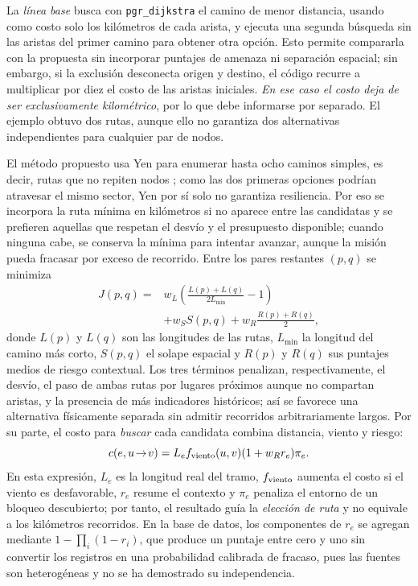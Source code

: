 \documentclass[journal,10pt]{IEEEtran}
\begin{document}
La \emph{línea base} busca con \texttt{pgr\_dijkstra} el camino de menor
distancia, usando como costo solo los kilómetros de cada arista, y ejecuta
una segunda búsqueda sin las aristas del primer camino para obtener otra
opción. Esto permite compararla con la propuesta sin incorporar puntajes
de amenaza ni separación espacial; sin embargo, si la exclusión
desconecta origen y destino, el código recurre a multiplicar por diez el
costo de las aristas iniciales. \emph{En ese caso el costo deja de ser
exclusivamente kilométrico}, por lo que debe informarse por separado.
El ejemplo obtuvo dos rutas, aunque ello no garantiza dos alternativas
independientes para cualquier par de nodos.

El método propuesto usa Yen para enumerar hasta ocho caminos simples, es
decir, rutas que no repiten nodos \cite{yen,pgr}; como las dos primeras
opciones podrían atravesar el mismo sector, Yen por sí solo no garantiza
resiliencia. Por eso se incorpora la ruta mínima en kilómetros si no
aparece entre las candidatas y se prefieren aquellas que respetan el
desvío y el presupuesto disponible; cuando ninguna cabe, se conserva la
mínima para intentar avanzar, aunque la misión pueda fracasar por exceso
de recorrido. Entre los pares restantes $(p,q)$ se minimiza
\begin{equation}
\begin{aligned}
 J(p,q)={}&w_L\!\left(\frac{L(p)+L(q)}{2L_{\min}}-1\right)\\
          &+w_S S(p,q)+w_R\frac{R(p)+R(q)}{2},
\end{aligned}
\end{equation}
donde $L(p)$ y $L(q)$ son las longitudes de las rutas, $L_{\min}$ la longitud
del camino más corto, $S(p,q)$ el solape espacial y $R(p)$ y $R(q)$ sus
puntajes medios de riesgo contextual. Los tres términos penalizan,
respectivamente, el desvío, el paso de ambas rutas por lugares próximos
aunque no compartan aristas, y la presencia de más indicadores
históricos; así se favorece una alternativa físicamente separada sin
admitir recorridos arbitrariamente largos. Por su parte, el costo para
\emph{buscar} cada candidata combina distancia, viento y riesgo:
\begin{equation}
 c(e,u\!\to\!v)=L_e f_{\rm viento}(u,v)(1+w_R r_e)\pi_e.
\end{equation}
En esta expresión, $L_e$ es la longitud real del tramo,
$f_{\rm viento}$ aumenta el costo si el viento es desfavorable, $r_e$
resume el contexto y $\pi_e$ penaliza el entorno de un bloqueo
descubierto; por tanto, el resultado guía la \emph{elección de ruta} y no
equivale a los kilómetros recorridos. En la base de datos, los
componentes de $r_e$ se agregan mediante $1-\prod_i(1-r_i)$, que produce
un puntaje entre cero y uno sin convertir los registros en una
probabilidad calibrada de fracaso, pues las fuentes son heterogéneas y
no se ha demostrado su independencia.
\end{document}
